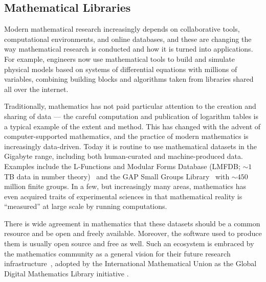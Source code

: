 \subsection{Mathematical Libraries}\label{sec:mathlib}

Modern mathematical research increasingly depends on collaborative tools, computational environments, and online databases, and these are changing the way mathematical research is conducted and how it is turned into applications.
For example, engineers now use mathematical tools to build and simulate physical models based on systems of differential equations with millions of variables, combining building blocks and algorithms taken from libraries shared all over the internet.

Traditionally, mathematics has not paid particular attention to the creation and sharing of data --- the careful computation and publication of logarithm tables is a typical example of the extent and method.
This has changed with the advent of computer-supported mathematics, and the practice of modern mathematics is increasingly data-driven.
Today it is routine to use mathematical datasets in the Gigabyte range, including both human-curated and machine-produced data.
Examples include the L-Functions and Modular Forms Database (LMFDB; $\sim 1$ TB data in number theory)~\cite{Cremona:LMFDB16,lmfdb:on} and the GAP Small Groups Library~\cite{GapSmallGroups:on} with $\sim 450$ million finite groups.  
In a few, but increasingly many areas, mathematics has even acquired traits of experimental sciences in that mathematical reality is ``measured'' at large scale by running computations.

There is wide agreement in mathematics that these datasets should be a common resource and be open and freely available.
Moreover, the software used to produce them is usually open source and free as well.
Such an ecosystem is embraced by the mathematics community as a general vision for their future research infrastructure~\cite{NAS14}, adopted by the International Mathematical Union as the Global Digital Mathematics Library initiative \cite{GDML:on}.

